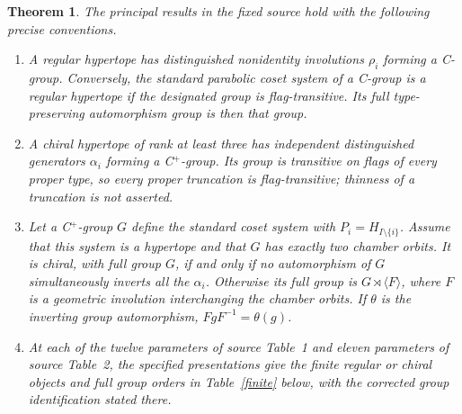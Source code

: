 \documentclass[11pt,a4paper]{article}
\newtheorem{theorem}{Theorem}\newtheorem{proposition}[theorem]{Proposition}
\newcommand{\gen}[1]{\langle#1\rangle}\newcommand{\Aut}{\operatorname{Aut}}
\begin{document}
\begin{theorem}\label{principal}
The principal results in the fixed source hold with the following precise
conventions.
\begin{enumerate}
\item A regular hypertope has distinguished nonidentity involutions
$\rho_i$ forming a C-group. Conversely, the standard parabolic coset system
of a C-group is a regular hypertope if the designated group is flag-transitive.
Its full type-preserving automorphism group is then that group.
\item A chiral hypertope of rank at least three has independent distinguished
generators $\alpha_i$ forming a C$^+$-group. Its group is transitive on flags
of every proper type, so every proper truncation is flag-transitive;
thinness of a truncation is not asserted.
\item Let a C$^+$-group $G$ define the standard coset system with
$P_i=H_{I\setminus\{i\}}$. Assume that this system is a hypertope and that
$G$ has exactly two chamber orbits. It is chiral, with full group $G$, if
and only if no automorphism of $G$ simultaneously inverts all the
$\alpha_i$. Otherwise its full group is $G\rtimes\gen F$, where $F$ is
a geometric involution interchanging the chamber orbits. If $\theta$ is
the inverting group automorphism, $FgF^{-1}=\theta(g)$.
\item At each of the twelve parameters of source Table~1 and eleven
parameters of source Table~2, the specified presentations give the finite
regular or chiral objects and full group orders in Table~\ref{finite} below,
with the corrected group identification stated there.
\end{enumerate}
\end{theorem}
\end{document}
